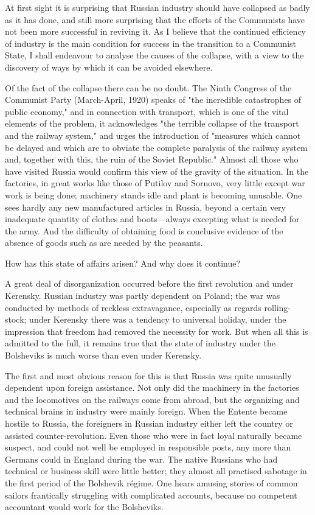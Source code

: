 At first sight it is surprising that Russian industry should have collapsed as badly as it has done, and still more surprising that the efforts of the Communists have not been more successful in reviving it. As I believe that the continued efficiency of industry is the main condition for success in the transition to a Communist State, I shall endeavour to analyse the causes of the collapse, with a view to the discovery of ways by which it can be avoided elsewhere.

Of the fact of the collapse there can be no doubt. The Ninth Congress of the Communist Party (March-April, 1920) speaks of "the incredible catastrophes of public economy," and in connection with transport, which is one of the vital elements of the problem, it acknowledges "the terrible collapse of the transport and the railway system," and urges the introduction of "measures which cannot be delayed and which are to obviate the complete paralysis of the railway system and, together with this, the ruin of the Soviet Republic." Almost all those who have visited Russia would confirm this view of the gravity of the situation. In the factories, in great works like those of Putilov and Sornovo, very little except war work is being done; machinery stands idle and plant is becoming unusable. One sees hardly any new manufactured articles in Russia, beyond a certain very inadequate quantity of clothes and boots---always excepting what is needed for the army. And the difficulty of obtaining food is conclusive evidence of the absence of goods such as are needed by the peasants.

How has this state of affairs arisen? And why does it continue?

A great deal of disorganization occurred before the first revolution and under Kerensky. Russian industry was partly dependent on Poland; the war was conducted by methods of reckless extravagance, especially as regards rolling-stock; under Kerensky there was a tendency to universal holiday, under the impression that freedom had removed the necessity for work. But when all this is admitted to the full, it remains true that the state of industry under the Bolsheviks is much worse than even under Kerensky.

The first and most obvious reason for this is that Russia was quite unusually dependent upon foreign assistance. Not only did the machinery in the factories and the locomotives on the railways come from abroad, but the organizing and technical brains in industry were mainly foreign. When the Entente became hostile to Russia, the foreigners in Russian industry either left the country or assisted counter-revolution. Even those who were in fact loyal naturally became suspect, and could not well be employed in responsible posts, any more than Germans could in England during the war. The native Russians who had technical or business skill were little better; they almost all practised sabotage in the first period of the Bolshevik régime. One hears amusing stories of common sailors frantically struggling with complicated accounts, because no competent accountant would work for the Bolsheviks.

